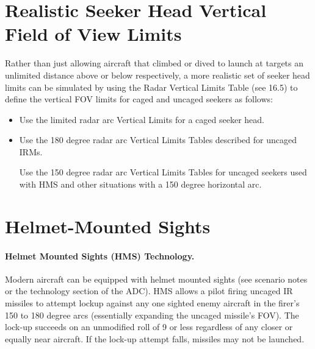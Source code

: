 \begin{advancedrules}

\section{Realistic Seeker Head Vertical Field of View Limits}
\label{rule:irm-realistic-vertical-limits}

Rather than just allowing aircraft that climbed or dived to launch at targets an unlimited distance above or below respectively, a more realistic set of seeker head limits can be simulated by using the Radar Vertical Limits Table (see 16.5) to define the vertical FOV limits for caged and uncaged seekers as follows:

\begin{itemize}

    \item Use the limited radar arc Vertical Limits for a caged seeker head.

    \item Use the 180 degree radar arc Vertical Limits Tables described for uncaged IRMs.

     Use the 150 degree radar arc Vertical Limits Tables for uncaged seekers used with HMS and other situations with a 150 degree horizontal arc.

\end{itemize}

\section{Helmet-Mounted Sights}
\label{rule:irm-hms}

\paragraph{Helmet Mounted Sights (HMS) Technology.} Modern aircraft can be equipped with helmet mounted sights (see scenario notes or the technology section of the ADC). HMS allows a pilot firing uncaged IR missiles to attempt lock­up against any one sighted enemy aircraft in the firer's 150 to 180 degree arcs (essentially expanding the uncaged missile's FOV). The lock-up succeeds on an unmodified roll of 9 or less regardless of any closer or equally near aircraft. If the lock-up attempt falls, missiles may not be launched.


\end{advancedrules}
